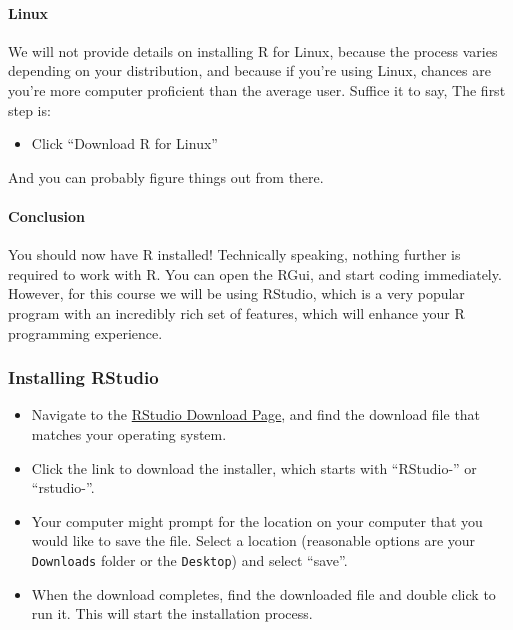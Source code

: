 \documentclass[
]{article}
\providecommand{\tightlist}{%
  \setlength{\itemsep}{0pt}\setlength{\parskip}{0pt}}
\begin{document}
\hypertarget{linux}{%
\paragraph{Linux}\label{linux}}

We will not provide details on installing R for Linux, because the process varies depending on your distribution, and because if you're using Linux, chances are you're more computer proficient than the average user.
Suffice it to say, The first step is:

\begin{itemize}
\tightlist
\item
  Click ``Download R for Linux''
\end{itemize}

And you can probably figure things out from there.

\hypertarget{conclusion}{%
\paragraph{Conclusion}\label{conclusion}}

You should now have R installed!
Technically speaking, nothing further is required to work with R.
You can open the RGui, and start coding immediately.
However, for this course we will be using RStudio, which is a very popular program with an incredibly rich set of features, which will enhance your R programming experience.

\hypertarget{installing-rstudio}{%
\subsubsection{Installing RStudio}\label{installing-rstudio}}

\begin{itemize}
\tightlist
\item
  Navigate to the \href{https://rstudio.com/products/rstudio/download/\#download}{RStudio Download Page}, and find the download file that matches your operating system.
\item
  Click the link to download the installer, which starts with ``RStudio-'' or ``rstudio-''.
\item
  Your computer might prompt for the location on your computer that you would like to save the file. Select a location (reasonable options are your \texttt{Downloads} folder or the \texttt{Desktop}) and select ``save''.
\item
  When the download completes, find the downloaded file and double click to run it. This will start the installation process.
\end{itemize}
\end{document}
